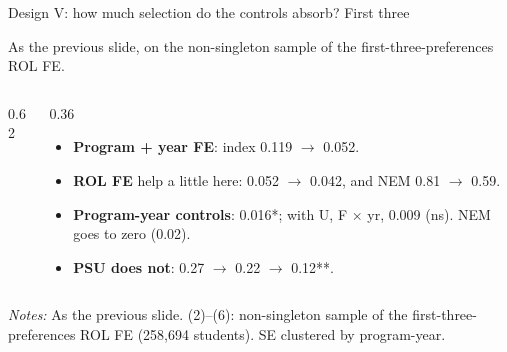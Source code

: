\documentclass{beamer}
\begin{document}
\begin{frame}[label=d5-balance-noctrl-top3]{Design V: how much selection do the controls absorb? First three}
\vspace{-0.2cm}
{\scriptsize As the previous slide, on the non-singleton sample of the first-three-preferences ROL FE.\par}
\vspace{0.05cm}
\begin{columns}[T,onlytextwidth]
\begin{column}{0.62\textwidth}
\centering
\resizebox{\linewidth}{!}{}
\end{column}
\begin{column}{0.36\textwidth}
\scriptsize
\begin{itemize}
    \setlength{\itemsep}{2pt}
    \item \textbf{Program + year FE}: index 0.119 $\to$ 0.052.
    \item \textbf{ROL FE} help a little here: 0.052 $\to$ 0.042, and NEM 0.81 $\to$ 0.59.
    \item \textbf{Program-year controls}: 0.016*; with U, F $\times$ yr, 0.009 (ns). NEM goes to zero (0.02).
    \item \textbf{PSU does not}: 0.27 $\to$ 0.22 $\to$ 0.12**.
\end{itemize}
\end{column}
\end{columns}

\vspace{0.05cm}
\parbox{0.97\textwidth}{\tiny \textit{Notes:} As the previous slide. (2)--(6): non-singleton sample of the first-three-preferences ROL FE (258,694 students). SE clustered by program-year.}
\end{frame}
\end{document}
